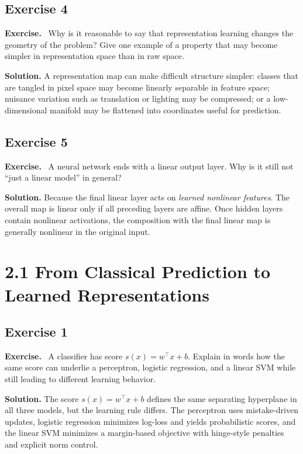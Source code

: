 \documentclass[11pt]{article}
\newenvironment{exercisebox}{\begin{framed}\noindent\textbf{Exercise.}\ }{\end{framed}}
\begin{document}
\subsection*{Exercise 4}
\begin{exercisebox}
Why is it reasonable to say that representation learning changes the geometry of the problem? Give one example of a property that may become simpler in representation space than in raw space.
\end{exercisebox}
\textbf{Solution.} A representation map can make difficult structure simpler: classes that are tangled in pixel space may become linearly separable in feature space; nuisance variation such as translation or lighting may be compressed; or a low-dimensional manifold may be flattened into coordinates useful for prediction.

\subsection*{Exercise 5}
\begin{exercisebox}
A neural network ends with a linear output layer. Why is it still not ``just a linear model'' in general?
\end{exercisebox}
\textbf{Solution.} Because the final linear layer acts on \emph{learned nonlinear features}. The overall map is linear only if all preceding layers are affine. Once hidden layers contain nonlinear activations, the composition with the final linear map is generally nonlinear in the original input.

\section{2.1 From Classical Prediction to Learned Representations}
\subsection*{Exercise 1}
\begin{exercisebox}
A classifier has score $s(x)=w^\top x+b$. Explain in words how the same score can underlie a perceptron, logistic regression, and a linear SVM while still leading to different learning behavior.
\end{exercisebox}
\textbf{Solution.} The score $s(x)=w^\top x+b$ defines the same separating hyperplane in all three models, but the learning rule differs. The perceptron uses mistake-driven updates, logistic regression minimizes log-loss and yields probabilistic scores, and the linear SVM minimizes a margin-based objective with hinge-style penalties and explicit norm control.
\end{document}
